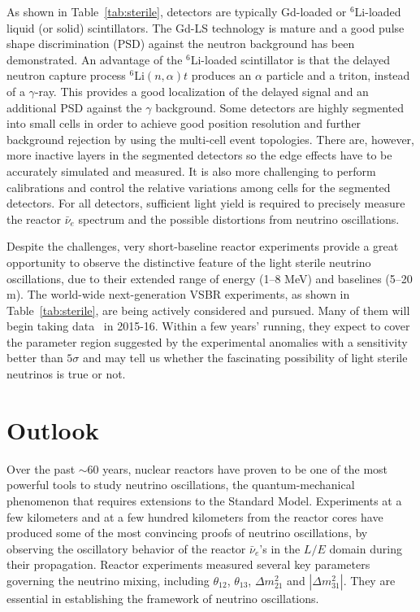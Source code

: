 \documentclass[aps,twocolumn,preprintnumbers,amsmath,superscriptaddress,amssymb,floats,nofootinbib]{revtex4-1}
\begin{document}
As shown in Table~\ref{tab:sterile}, detectors are typically Gd-loaded or $^{6}$Li-loaded liquid (or solid) scintillators. 
The Gd-LS technology is mature and a good pulse shape discrimination (PSD) against the neutron background has been demonstrated. 
An advantage of the $^{6}$Li-loaded scintillator is that the 
delayed neutron capture process $^{6}$Li$(n,\alpha)t$ produces an $\alpha$ particle and a triton, instead of a $\gamma$-ray. 
This provides a good localization of the delayed signal and an additional PSD against the $\gamma$ background. 
Some detectors are highly segmented into small cells in order to achieve good position resolution and further background rejection by using the multi-cell event topologies. 
There are, however, more inactive layers in the segmented detectors so the edge effects have to be accurately simulated and measured.
It is also more challenging to perform calibrations and control the relative variations among cells for the segmented detectors.
For all detectors, sufficient light yield is required to precisely measure the reactor $\bar\nu_e$ spectrum and the possible distortions from neutrino oscillations.


Despite the challenges, very short-baseline reactor experiments provide a great opportunity to observe the distinctive feature of the light sterile neutrino oscillations, due to their extended range of energy (1--8 MeV) and baselines (5--20 m). 
The world-wide next-generation VSBR experiments, as shown in Table~\ref{tab:sterile}, are being actively considered and pursued.
Many of them will begin taking data~\cite{Lasserre-Neutrino14} in 2015-16. Within a few years' running, they expect to cover the parameter region 
suggested by the experimental anomalies with a sensitivity better than $5\sigma$ and 
may tell us whether the fascinating possibility of light sterile neutrinos is true or not.


\section{Outlook} 
\label{sec:final}

Over the past $\sim$60 years, nuclear reactors have proven to be one of the most powerful tools to study neutrino oscillations, the quantum-mechanical phenomenon that requires extensions to the Standard Model. Experiments at a few kilometers and at a few hundred kilometers from the reactor cores have produced some of the most convincing proofs of neutrino oscillations, by observing the oscillatory behavior of the reactor $\bar\nu_e$'s in the $L/E$ domain during their propagation. Reactor experiments measured several key parameters governing the neutrino mixing, including $\theta_{12}$, $\theta_{13}$, $\Delta{m}^2_{21}$ and $|\Delta{m}^2_{31}|$. They are essential in establishing the framework of neutrino oscillations.
\end{document}
